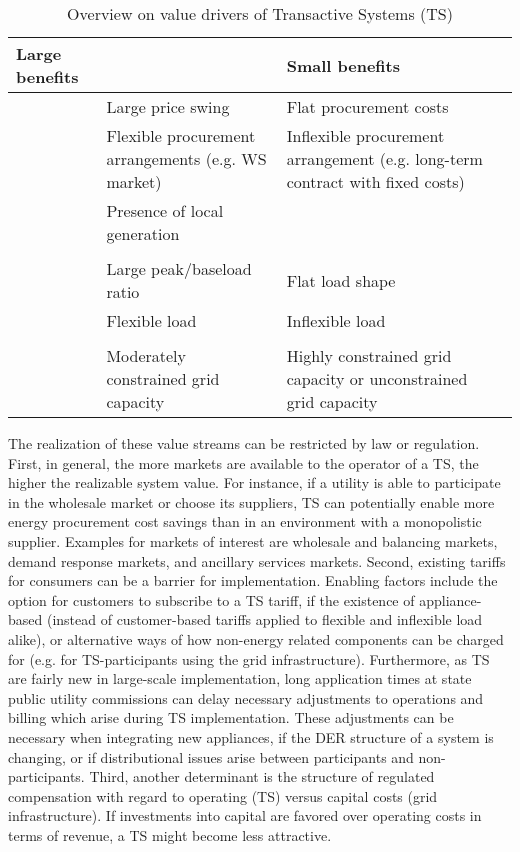 \begin{table}[ht!]
\centering
\footnotesize
\begin{tabular}{>{\raggedright}m{2cm}| >{\centering\arraybackslash} m{4cm} >{\centering\arraybackslash} m{4cm}| >{\centering\arraybackslash} m{2cm}}
\toprule
Large benefits		& \multicolumn{2}{c|}{\textbf{Supply}}	&  Small benefits
\\ \midrule
        & Large price swing & Flat procurement costs &
\\ \hline
        & Flexible procurement arrangements (e.g. WS market) & Inflexible procurement arrangement (e.g. long-term contract with fixed costs) &
\\ \hline
        & Presence of local generation & &
\\
\hline %
		& \multicolumn{2}{c}{\textbf{Demand}}	& 
\\ \hline
        & Large peak/baseload ratio & Flat load shape &
\\
        & Flexible load & Inflexible load &
\\
\hline %
		& \multicolumn{2}{c}{\textbf{Grid}}	& 
\\ 
        & Moderately constrained grid capacity & Highly constrained grid capacity or unconstrained grid capacity &
\\ 
\bottomrule
\end{tabular}
\caption{Overview on value drivers of Transactive Systems (TS)}
\label{tab:value_drivers}
\end{table}

The realization of these value streams can be restricted by law or regulation. 
First, in general, the more markets are available to the operator of a TS, the higher the realizable system value. For instance, if a utility is able to participate in the wholesale market or choose its suppliers, TS can potentially enable more energy procurement cost savings than in an environment with a monopolistic supplier. Examples for markets of interest are wholesale and balancing markets, demand response markets, and ancillary services markets. 
Second, existing tariffs for consumers can be a barrier for implementation. Enabling factors include the option for customers to subscribe to a TS tariff,  if the existence of appliance-based (instead of customer-based tariffs applied to flexible and inflexible load alike), or alternative ways of how non-energy related components can be charged for (e.g. for TS-participants using the grid infrastructure). Furthermore, as TS are fairly new in large-scale implementation, long application times at state public utility commissions can delay necessary adjustments to operations and billing which arise during TS implementation. These adjustments can be necessary when integrating new appliances, if the DER structure of a system is changing, or if distributional issues arise between participants and non-participants. 
Third, another determinant is the structure of regulated compensation with regard to operating (TS) versus capital costs (grid infrastructure). If investments into capital are favored over operating costs in terms of revenue, a TS might become less attractive.

